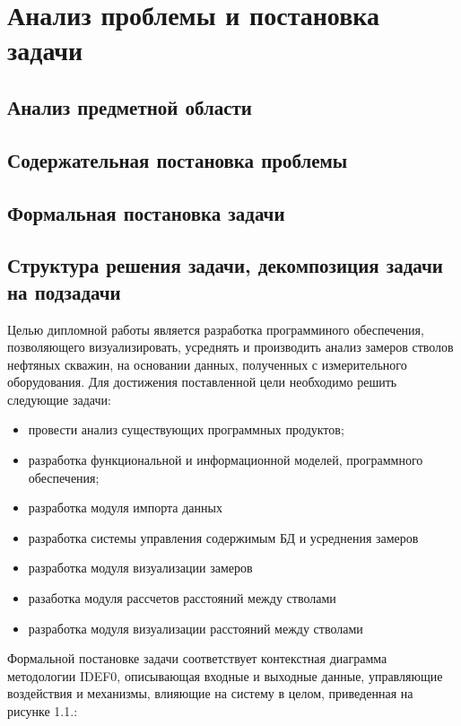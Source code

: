 \newpage
\section{Анализ проблемы и постановка задачи}



\subsection{Анализ предметной области}

\subsection{Содержательная постановка проблемы}

\subsection{Формальная постановка задачи}
\subsection{Структура решения задачи, декомпозиция задачи на подзадачи}
Целью дипломной работы является разработка программиного обеспечения, позволяющего визуализировать, усреднять и производить анализ замеров стволов нефтяных скважин,
на основании данных, полученных с измерительного оборудования. Для достижения поставленной цели необходимо решить следующие задачи:
\begin{itemize}
  \item провести анализ существующих программных продуктов;
  \item разработка функциональной и информационной моделей, программного обеспечения;
  \item разработка модуля импорта данных
  \item разработка системы управления содержимым БД и усреднения замеров
  \item разработка модуля визуализации замеров
  \item разаботка модуля рассчетов расстояний между стволами
  \item разработка модуля визуализации расстояний между стволами
\end{itemize}

Формальной постановке задачи соответствует контекстная диаграмма методологии IDEF0, описывающая входные и выходные данные, управляющие воздействия и механизмы,
влияющие на систему в целом, приведенная на рисунке 1.1.:

